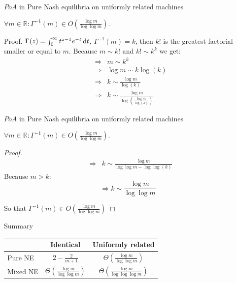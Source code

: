 \documentclass{beamer}
\newcommand{\R}{\mathbb{R}}
\begin{document}
\begin{frame}{$PoA$ in Pure Nash equilibria on uniformly related machines}

\begin{lemma}
$\forall m \in \R: \Gamma^{-1}(m) \in O\left(\frac{\log m}{\log \log m}\right)$.
\end{lemma}
\begin{block}{Proof.}
$\Gamma(z) = \int_0^\infty  t^{z-1} e^{-t}\,{\rm d}t$, $\Gamma^{-1}(m) = k$, then $k!$ is the greatest factorial smaller or equal to $m$. Because $m \sim k!$ and $k! \sim k^k$ we get:
\vspace{-.8cm}
\begin{eqnarray*}
&\Rightarrow& m \sim k^{k} \\
&\Rightarrow& \log m \sim k\log(k) \\
&\Rightarrow& k \sim \frac{\log m}{\log(k)}\\
&\Rightarrow& k \sim \frac{\log m}{\log(\frac{\log m}{\log (k)})}
\end{eqnarray*}

\end{block}


\end{frame}
\begin{frame}{$PoA$ in Pure Nash equilibria on uniformly related machines}

\begin{lemma}
$\forall m \in \R: \Gamma^{-1}(m) \in O\left(\frac{\log m}{\log \log m}\right)$.
\end{lemma}

\begin{proof}
\vspace{-.4cm}
\begin{eqnarray*}
&\Rightarrow& k \sim \frac{\log m}{\log\log m - \log\log (k)}
\end{eqnarray*}
Because $m > k$:
$$\Rightarrow k \sim \frac{\log m}{\log \log m}$$

So that $\Gamma^{-1}(m) \in O\left(\frac{\log m}{\log \log m}\right)$
\end{proof}
\end{frame}

\begin{frame}{Summary}

\begin{center}
\begin{tabular}{l|c|c}

   & Identical & Uniformly related \\
   \hline

   \hline
  Pure NE & $2-\frac{2}{m+1}$ & $\Theta\left(\frac{\log m}{\log \log m}\right)$ \\
  \hline
  Mixed NE & $\Theta\left(\frac{\log m}{\log \log m}\right)$ & $\Theta\left(\frac{\log m}{\log \log \log m}\right)$ \\
  \hline
\end{tabular}
\end{center}

\end{frame}
\end{document}
